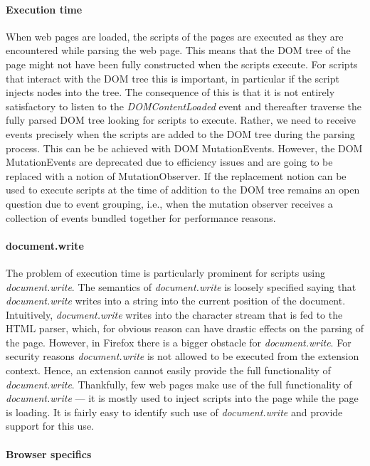 \documentclass{llncs}
\begin{document}
\paragraph{Execution time}

When web pages are loaded, the scripts of the pages are executed as they are
encountered while parsing the web page. This means that the DOM tree of the
page might not have been fully constructed when the scripts execute.  For
scripts that interact with the DOM tree this is important, in particular if the
script injects nodes into the tree. The consequence of this is that it is not
entirely satisfactory to listen to the \emph{DOMContentLoaded} event and
thereafter traverse the fully parsed DOM tree looking for scripts to execute.
Rather, we need to receive events precisely when the scripts are added to the
DOM tree during the parsing process. This can be be achieved with DOM
MutationEvents. However, the DOM MutationEvents are deprecated due to
efficiency issues and are going to be replaced with a notion of
MutationObserver.  If the replacement notion can be used to execute scripts at
the time of addition to the DOM tree remains an open question due to event
grouping, i.e., when the mutation observer receives a collection of events
bundled together for performance reasons. 


\paragraph{document.write} The problem of execution time is particularly
prominent for scripts using \emph{document.write}. The semantics of
\emph{document.write} is loosely specified saying that \emph{document.write}
writes into a string into the current position of the document.  Intuitively,
\emph{document.write} writes into the character stream that is fed to the HTML
parser, which, for obvious reason can have drastic effects on the parsing of
the page.  However, in Firefox there is a bigger obstacle for
\emph{document.write}. For security reasons \emph{document.write} is not
allowed to be executed from the extension context.  Hence, an extension cannot
easily provide the full functionality of \emph{document.write}.  Thankfully,
few web pages make use of the full functionality of \emph{document.write} ---
it is mostly used to inject scripts into the page while the page is loading. It
is fairly easy to identify such use of \emph{document.write} and provide
support for this use.


\paragraph{Browser specifics}
\end{document}
